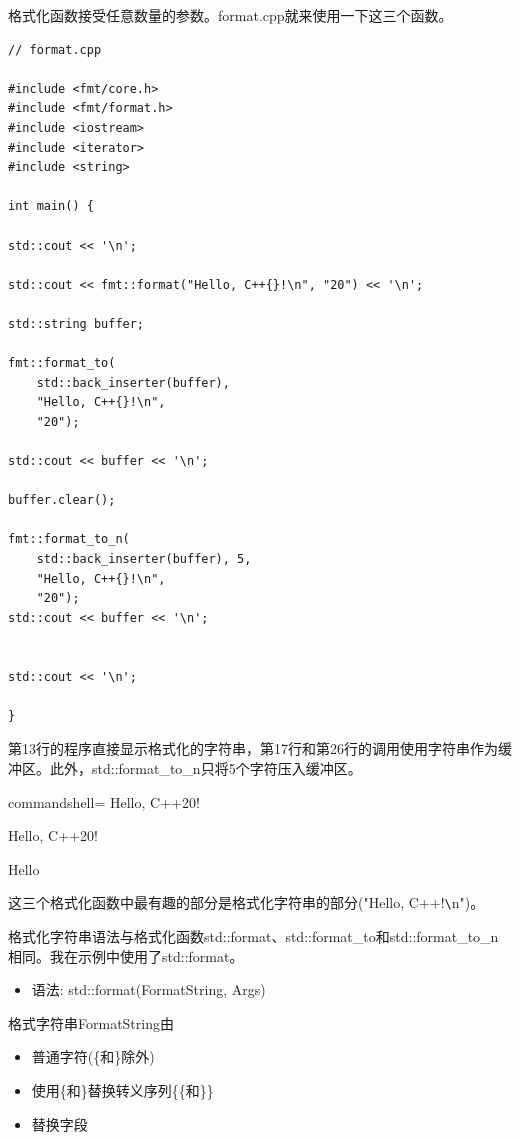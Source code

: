 格式化函数接受任意数量的参数。format.cpp就来使用一下这三个函数。

\begin{lstlisting}[style=styleCXX]
// format.cpp

#include <fmt/core.h>
#include <fmt/format.h>
#include <iostream>
#include <iterator>
#include <string>

int main() {

std::cout << '\n';

std::cout << fmt::format("Hello, C++{}!\n", "20") << '\n';

std::string buffer;

fmt::format_to(
	std::back_inserter(buffer),
	"Hello, C++{}!\n",
	"20");

std::cout << buffer << '\n';

buffer.clear();

fmt::format_to_n(
	std::back_inserter(buffer), 5,
	"Hello, C++{}!\n",
	"20");
std::cout << buffer << '\n';


std::cout << '\n';

}
\end{lstlisting}

第13行的程序直接显示格式化的字符串，第17行和第26行的调用使用字符串作为缓冲区。此外，std::format\_to\_n只将5个字符压入缓冲区。

\begin{tcblisting}{commandshell={}}
Hello, C++20!

Hello, C++20!

Hello
\end{tcblisting}

这三个格式化函数中最有趣的部分是格式化字符串的部分("Hello, C++{}!\verb|\|n")。


格式化字符串语法与格式化函数std::format、std::format\_to和std::format\_to\_n相同。我在示例中使用了std::format。

\begin{itemize}
\item 
语法: std::format(FormatString, Args)
\end{itemize}

格式字符串FormatString由

\begin{itemize}
\item 
普通字符(\{和\}除外)

\item 
使用\{和\}替换转义序列\{\{和\}\}

\item 
替换字段
\end{itemize}

